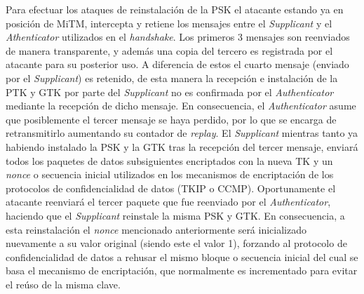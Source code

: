 \documentclass[10pt,a4paper]{article}
\begin{document}
Para efectuar los ataques de reinstalación de la PSK el atacante estando ya en posición de MiTM, intercepta y retiene los mensajes entre el \textit{Supplicant} y el \textit{Athenticator} utilizados en el \textit{handshake}. Los primeros 3 mensajes son reenviados de manera transparente, y además una copia del tercero es registrada por el atacante para su posterior uso. A diferencia de estos el cuarto mensaje (enviado por el \textit{Supplicant}) es retenido, de esta manera la recepción e instalación de la PTK y GTK por parte del \textit{Supplicant} no es confirmada por el \textit{Authenticator} mediante la recepción de dicho mensaje. En consecuencia, el \textit{Authenticator} asume que posiblemente el tercer mensaje se haya perdido, por lo que se encarga de retransmitirlo aumentando su contador de \textit{replay}. El \textit{Supplicant} mientras tanto ya habiendo instalado la PSK y la GTK tras la recepción del tercer mensaje, enviará todos los paquetes de datos subsiguientes encriptados con la nueva TK y un \textit{nonce} o secuencia inicial utilizados en los mecanismos de encriptación de los protocolos de confidencialidad de datos (TKIP o CCMP). Oportunamente el atacante reenviará el tercer paquete que fue reenviado por el \textit{Authenticator}, haciendo que el \textit{Supplicant} reinstale la misma PSK y GTK. En consecuencia, a esta reinstalación el \textit{nonce} mencionado anteriormente será inicializado nuevamente a su valor original (siendo este el valor 1), forzando al protocolo de confidencialidad de datos a rehusar el mismo bloque o secuencia inicial del cual se basa el mecanismo de encriptación, que normalmente es incrementado para evitar el reúso de la misma clave.
\end{document}
